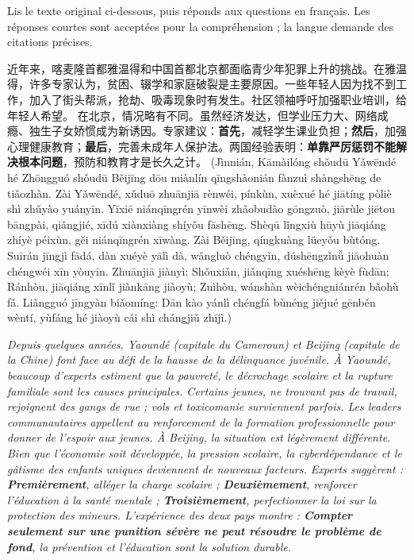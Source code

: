 \documentclass[11pt]{article}
\newcounter{popsec}
\newcounter{popsub}
\newcommand{\courssub}[1]{%
  \stepcounter{popsub}%
  \par\vspace{9pt}\noindent{\popxbold\fontsize{11.5}{13}\selectfont\color{popink}{\color{poporange}\thepopsec.\thepopsub}\hspace{6pt}#1}\par\nopagebreak\vspace{4pt}
}
\begin{document}
\courssub{Je me prépare au Bac}

\begin{exercice}
Lis le texte original ci-dessous, puis réponds aux questions en français. Les réponses courtes sont acceptées pour la compréhension ; la langue demande des citations précises.
\begin{textebox}
近年来，喀麦隆首都雅温得和中国首都北京都面临青少年犯罪上升的挑战。在雅温得，许多专家认为，贫困、辍学和家庭破裂是主要原因。一些年轻人因为找不到工作，加入了街头帮派，抢劫、吸毒现象时有发生。社区领袖呼吁加强职业培训，给年轻人希望。
在北京，情况略有不同。虽然经济发达，但学业压力大、网络成瘾、独生子女娇惯成为新诱因。专家建议：\textbf{首先}，减轻学生课业负担；\textbf{然后}，加强心理健康教育；\textbf{最后}，完善未成年人保护法。两国经验表明：\textbf{单靠严厉惩罚不能解决根本问题}，预防和教育才是长久之计。
(Jìnnián, Kāmàilóng shǒudū Yǎwēndé hé Zhōngguó shǒudū Běijīng dōu miànlín qīngshàonián fànzuì shàngshēng de tiǎozhàn. Zài Yǎwēndé, xǔduō zhuānjiā rènwéi, pínkùn, xuèxué hé jiātíng pòliè shì zhǔyào yuányīn. Yīxiē niánqīngrén yīnwèi zhǎobudào gōngzuò, jiārùle jiētou bāngpài, qiǎngjié, xīdú xiànxiàng shíyǒu fāshēng. Shèqū lǐngxiù hūyù jiāqiáng zhíyè péixùn, gěi niánqīngrén xīwàng. Zài Běijīng, qíngkuàng lüeyǒu bùtóng. Suīrán jīngjì fādá, dàn xuéyè yālì dà, wǎngluò chéngyǐn, dúshēngzǐnǚ jiāohuàn chéngwéi xīn yòuyīn. Zhuānjiā jiànyì: Shǒuxiǎn, jiǎnqīng xuéshēng kèyè fùdān; Ránhòu, jiāqiáng xīnlǐ jiànkāng jiàoyù; Zuìhòu, wánshàn wèichéngniánrén bǎohù fǎ. Liǎngguó jīngyàn biǎomíng: Dān kào yánlì chéngfá bùnéng jiějué gēnběn wèntí, yùfáng hé jiàoyù cái shì chángjiǔ zhījì.)
\par\emph{Depuis quelques années, Yaoundé (capitale du Cameroun) et Beijing (capitale de la Chine) font face au défi de la hausse de la délinquance juvénile. À Yaoundé, beaucoup d'experts estiment que la pauvreté, le décrochage scolaire et la rupture familiale sont les causes principales. Certains jeunes, ne trouvant pas de travail, rejoignent des gangs de rue ; vols et toxicomanie surviennent parfois. Les leaders communautaires appellent au renforcement de la formation professionnelle pour donner de l'espoir aux jeunes. À Beijing, la situation est légèrement différente. Bien que l'économie soit développée, la pression scolaire, la cyberdépendance et le gâtisme des enfants uniques deviennent de nouveaux facteurs. Experts suggèrent : \textbf{Premièrement}, alléger la charge scolaire ; \textbf{Deuxièmement}, renforcer l'éducation à la santé mentale ; \textbf{Troisièmement}, perfectionner la loi sur la protection des mineurs. L'expérience des deux pays montre : \textbf{Compter seulement sur une punition sévère ne peut résoudre le problème de fond}, la prévention et l'éducation sont la solution durable.}

\end{textebox}
\end{exercice}
\end{document}
